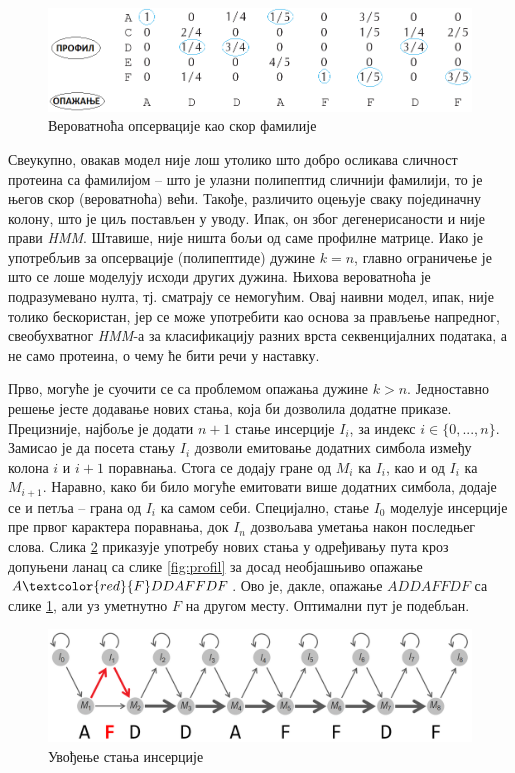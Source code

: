 \documentclass[12pt,oneside]{memoir}
\begin{document}
\begin{CJK}{UTF8}{ipxm}
\begin{figure}[H]
  \centering
  \includegraphics[width=\textwidth]{prof_ishod.png}
  \caption{Вероватноћа опсервације као скор фамилије \cite{compeau2015}}
  \label{fig:prof_ishod}
\end{figure}

Свеукупно, овакав модел није лош утолико што добро осликава сличност протеина са фамилијом -- што је улазни полипептид сличнији фамилији, то је његов скор (вероватноћа) већи. Такође, различито оцењује сваку појединачну колону, што је циљ постављен у уводу. Ипак, он због дегенерисаности и није прави \textit{HMM}. Штавише, није ништа бољи од саме профилне матрице. Иако је употребљив за опсервације (полипептиде) дужине $k = n$, главно ограничење је што се лоше моделују исходи других дужина. Њихова вероватноћа је подразумевано нулта, тј. сматрају се немогућим. Овај наивни модел, ипак, није толико бескористан, јер се може употребити као основа за прављење напредног, свеобухватног \textit{HMM}-а за класификацију разних врста секвенцијалних података, а не само протеина, о чему ће бити речи у наставку.

Прво, могуће је суочити се са проблемом опажања дужине $k > n$. Једноставно решење јесте додавање нових стања, која би дозволила додатне приказе. Прецизније, најбоље је додати $n+1$ стање инсерције $I_i$, за индекс $i \in \{0, ..., n\}$. Замисао је да посета стању $I_i$ дозволи емитовање додатних симбола између колона $i$ и $i+1$ поравнања. Стога се додају гране од $M_i$ ка $I_i$, као и од $I_i$ ка $M_{i+1}$. Наравно, како би било могуће емитовати више додатних симбола, додаје се и петља -- грана од $I_i$ ка самом себи. Специјално, стање $I_0$ моделује инсерције пре првог карактера поравнања, док $I_n$ дозвољава уметања након последњег слова. Слика \ref{fig:insercije} приказује употребу нових стања у одређивању пута кроз допуњени ланац са слике \ref{fig:profil} за досад необјашњиво опажање $A\textcolor{red}{F}DDAFFDF$. Ово је, дакле, опажање $ADDAFFDF$ са слике \ref{fig:prof_ishod}, али уз уметнутно $F$ на другом месту. Оптимални пут је подебљан.

\begin{figure}[H]
  \centering
  \includegraphics[width=\textwidth]{insercije.png}
  \caption{Увођење стања инсерције \cite{compeau2015}}
  \label{fig:insercije}
\end{figure}


\end{CJK}
\end{document}
